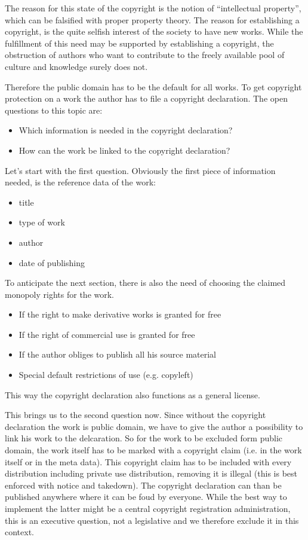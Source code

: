 The reason for this state of the copyright is the notion of ``intellectual property'', which can be falsified with proper property theory. The reason for establishing a copyright, is the quite selfish interest of the society to have new works. While the fulfillment of this need may be supported by establishing a copyright, the obstruction of authors who want to contribute to the freely available pool of culture and knowledge surely does not.

Therefore the public domain has to be the default for all works. To get copyright protection on a work the author has to file a copyright declaration. The open questions to this topic are:
\begin{itemize}
	\item Which information is needed in the copyright declaration?
	\item How can the work be linked to the copyright declaration?
\end{itemize}

Let's start with the first question. Obviously the first piece of information needed, is the reference data of the work:
\begin{itemize}
	\item title
	\item type of work
	\item author
	\item date of publishing
\end{itemize}
To anticipate the next section, there is also the need of choosing the claimed monopoly rights for the work. 
\begin{itemize}
	\item If the right to make derivative works is granted for free
	\item If the right of commercial use is granted for free
	\item If the author obliges to publish all his source material
	\item Special default restrictions of use (e.g. copyleft)
\end{itemize}
This way the copyright declaration also functions as a general license.

This brings us to the second question now. Since without the copyright declaration the work is public domain, we have to give the author a possibility to link his work to the delcaration. So for the work to be excluded form public domain, the work itself has to be marked with a copyright claim (i.e. in the work itself or in the meta data). This copyright claim has to be included with every distribution including private use distribution, removing it is illegal (this is best enforced with notice and takedown). The copyright declaration can than be published anywhere where it can be foud by everyone. While the best way to implement the latter might be a central copyright registration administration, this is an executive question, not a legislative and we therefore exclude it in this context. 

